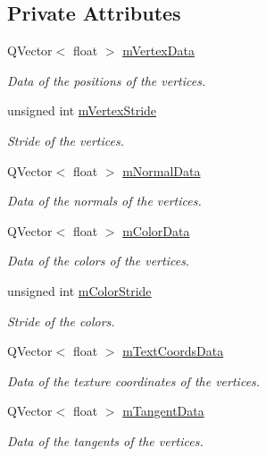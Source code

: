 \subsection*{Private Attributes}
\begin{DoxyCompactItemize}
\item 
Q\+Vector$<$ float $>$ \hyperlink{class_geometry_aa1ab4726f4b285d37e98a69f212ac92a}{m\+Vertex\+Data}
\begin{DoxyCompactList}\small\item\em Data of the positions of the vertices. \end{DoxyCompactList}\item 
unsigned int \hyperlink{class_geometry_aa3d70589b74acec8de5487d1797204a6}{m\+Vertex\+Stride}
\begin{DoxyCompactList}\small\item\em Stride of the vertices. \end{DoxyCompactList}\item 
Q\+Vector$<$ float $>$ \hyperlink{class_geometry_aeb01f8834836e53482da4116bdcb7b42}{m\+Normal\+Data}
\begin{DoxyCompactList}\small\item\em Data of the normals of the vertices. \end{DoxyCompactList}\item 
Q\+Vector$<$ float $>$ \hyperlink{class_geometry_ad7e8ca05ff8a0629af98afedc5935b29}{m\+Color\+Data}
\begin{DoxyCompactList}\small\item\em Data of the colors of the vertices. \end{DoxyCompactList}\item 
unsigned int \hyperlink{class_geometry_afa6ac722cc0fad9071d5802560250eb3}{m\+Color\+Stride}
\begin{DoxyCompactList}\small\item\em Stride of the colors. \end{DoxyCompactList}\item 
Q\+Vector$<$ float $>$ \hyperlink{class_geometry_afd1dd852a551a6e2c4ea6fad41aceb68}{m\+Text\+Coords\+Data}
\begin{DoxyCompactList}\small\item\em Data of the texture coordinates of the vertices. \end{DoxyCompactList}\item 
Q\+Vector$<$ float $>$ \hyperlink{class_geometry_a7c1d990e17927df0bba609636ae646a2}{m\+Tangent\+Data}
\begin{DoxyCompactList}\small\item\em Data of the tangents of the vertices. \end{DoxyCompactList}\item 

\end{DoxyCompactItemize}
